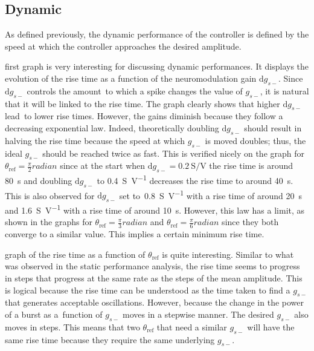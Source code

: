 \subsection{Dynamic}

As defined previously, the dynamic performance of the controller is defined by the speed at which the controller approaches the desired amplitude.

 first graph is very interesting for discussing dynamic performances.
It displays the evolution of the rise time as a function of the neuromodulation gain $\mathrm{d}g_{s-}$.
Since $\mathrm{d}g_{s-}$ controls the amount to which a spike changes the value of $g_{s-}$, it is natural that it will be linked to the rise time.
The graph clearly shows that higher $\mathrm{d}g_{s-}$ lead to lower rise times.
However, the gains diminish because they follow a decreasing exponential law.
Indeed, theoretically doubling $\mathrm{d}g_{s-}$ should result in halving the rise time because the speed at which $g_{s-}$ is moved doubles; thus, the ideal $g_{s-}$ should be reached twice as fast.
This is verified nicely on the graph for $\theta_\text{ref}=\frac{\pi}{2}\unit{radian}$ since at the start when $\mathrm{d}g_{s-} = \qty{0.2}{\siemens\per\volt}$ the rise time is around \qty{80}{\second} and doubling $\mathrm{d}g_{s-}$ to \qty{0.4}{\siemens\per\volt} decreases the rise time to around \qty{40}{\second}.
This is also observed for $\mathrm{d}g_{s-}$ set to \qty{0.8}{\siemens\per\volt} with a rise time of around \qty{20}{\second} and \qty{1.6}{\siemens\per\volt} with a rise time of around \qty{10}{\second}.
However, this law has a limit, as shown in the graphs for $\theta_\text{ref}=\frac{\pi}{3}\unit{radian}$ and $\theta_\text{ref}=\frac{\pi}{6}\unit{radian}$ since they both converge to a similar value.
This implies a certain minimum rise time.

 graph of the rise time as a function of $\theta_\text{ref}$ is quite interesting.
Similar to what was observed in the static performance analysis, the rise time seems to progress in steps that progress at the same rate as the steps of the mean amplitude.
This is logical because the rise time can be understood as the time taken to find a $g_{s-}$ that generates acceptable oscillations.
However, because the change in the power of a burst as a function of $g_{s-}$ moves in a stepwise manner. The desired $g_{s-}$ also moves in steps.
This means that two $\theta_\text{ref}$ that need a similar $g_{s-}$ will have the same rise time because they require the same underlying $g_{s-}$.

